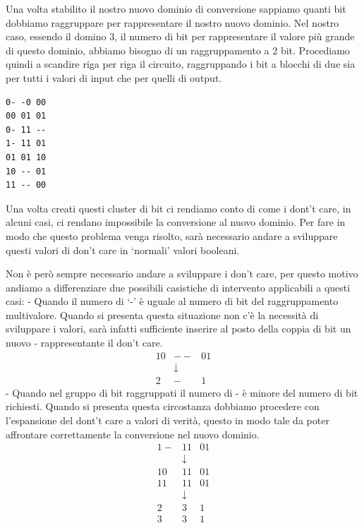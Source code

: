 \documentclass[
  italian,
]{book}
\begin{document}
\newpage

Una volta stabilito il nostro nuovo dominio di conversione sappiamo quanti bit dobbiamo raggruppare per rappresentare il nostro nuovo dominio. Nel nostro caso, essendo il domino 3, il numero di bit per rappresentare il valore più grande di questo dominio, abbiamo bisogno di un raggruppamento a 2 bit. Procediamo quindi a scandire riga per riga il circuito, raggruppando i bit a blocchi di due sia per tutti i valori di input che per quelli di output.

\begin{verbatim}
0- -0 00    
00 01 01
0- 11 --
1- 11 01
01 01 10
10 -- 01
11 -- 00
\end{verbatim}

Una volta creati questi cluster di bit ci rendiamo conto di come i dont't care, in alcuni casi, ci rendano impossibile la conversione al nuovo dominio. Per fare in modo che questo problema venga risolto, sarà necessario andare a sviluppare questi valori di don't care in `normali' valori booleani.

\newpage

Non è però sempre necessario andare a sviluppare i don't care, per questo motivo andiamo a differenziare due possibili casistiche di intervento applicabili a questi casi:
- Quando il numero di `-' è uguale al numero di bit del raggruppamento multivalore. Quando si presenta questa situazione non c'è la necessità di sviluppare i valori, sarà infatti sufficiente inserire al posto della coppia di bit un nuovo - rappresentante il don't care.
\[ \begin{array}{ccc}
        10 & -- & 01 \\ & \downarrow & \\ 2 & - & 1 
    \end{array}\]
- Quando nel gruppo di bit raggruppati il numero di - è minore del numero di bit richiesti. Quando si presenta questa circostanza dobbiamo procedere con l'espansione del dont't care a valori di verità, questo in modo tale da poter affrontare correttamente la conversione nel nuovo dominio.
\[ \begin{array}{cccc}
            1- & 11 & 01\\
            & \downarrow &\\
            10 & 11 & 01\\
            11 & 11 & 01\\
            & \downarrow &\\
            2 & 3 & 1\\
            3 & 3 & 1
        \end{array}\]
\end{document}
